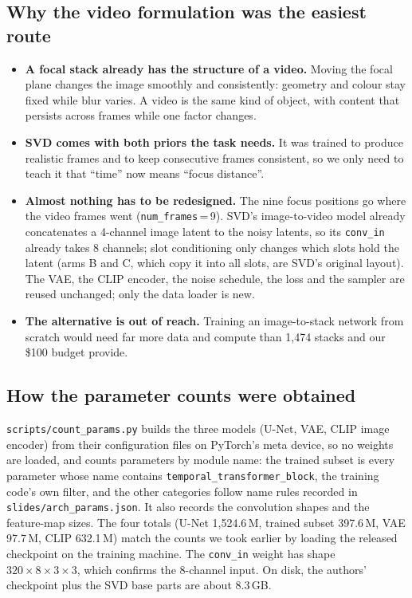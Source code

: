 \documentclass[11pt]{article}
\begin{document}
\subsection{Why the video formulation was the easiest route}\label{sec:whyvideo}
\begin{itemize}[leftmargin=*,itemsep=2pt]
  \item \textbf{A focal stack already has the structure of a video.} Moving the focal plane changes the image smoothly and consistently: geometry and colour stay fixed while blur varies. A video is the same kind of object, with content that persists across frames while one factor changes.
  \item \textbf{SVD comes with both priors the task needs.} It was trained to produce realistic frames and to keep consecutive frames consistent, so we only need to teach it that ``time'' now means ``focus distance''.
  \item \textbf{Almost nothing has to be redesigned.} The nine focus positions go where the video frames went (\texttt{num\_frames}\,=\,9). SVD's image-to-video model already concatenates a 4-channel image latent to the noisy latents, so its \texttt{conv\_in} already takes 8 channels; slot conditioning only changes which slots hold the latent (arms B and C, which copy it into all slots, are SVD's original layout). The VAE, the CLIP encoder, the noise schedule, the loss and the sampler are reused unchanged; only the data loader is new.
  \item \textbf{The alternative is out of reach.} Training an image-to-stack network from scratch would need far more data and compute than 1{,}474 stacks and our \$100 budget provide.
\end{itemize}

\subsection{How the parameter counts were obtained}\label{sec:counting}
\texttt{scripts/count\_params.py} builds the three models (U-Net, VAE, CLIP image encoder) from their configuration files on PyTorch's meta device, so no weights are loaded, and counts parameters by module name: the trained subset is every parameter whose name contains \texttt{temporal\_transformer\_block}, the training code's own filter, and the other categories follow name rules recorded in \texttt{slides/arch\_params.json}. It also records the convolution shapes and the feature-map sizes.
The four totals (U-Net 1{,}524.6\,M, trained subset 397.6\,M, VAE 97.7\,M, CLIP 632.1\,M) match the counts we took earlier by loading the released checkpoint on the training machine. The \texttt{conv\_in} weight has shape $320\times8\times3\times3$, which confirms the 8-channel input. On disk, the authors' checkpoint plus the SVD base parts are about 8.3\,GB.
\end{document}
